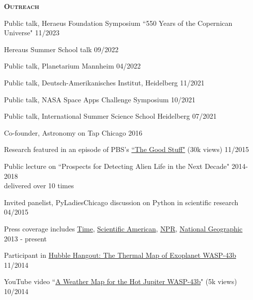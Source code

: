 \documentclass[12pt,letterpaper]{article}
\begin{document}
\textbf{\textsc{Outreach}} 
\begin{compactitem}[]
\item Public talk, Heraeus Foundation Symposium  ``550 Years of the Copernican Universe"  \hfill 11/2023
\item Hereaus Summer School talk \hfill 09/2022
\item Public talk, Planetarium Mannheim \hfill 04/2022
\item Public talk, Deutsch-Amerikanisches Institut, Heidelberg \hfill 11/2021
\item Public talk, NASA Space Apps Challenge Symposium \hfill 10/2021
\item Public talk, International Summer Science School Heidelberg \hfill 07/2021
\item Co-founder, Astronomy on Tap Chicago \hfill 2016
\item Research featured in an episode of PBS's \href{https://www.youtube.com/watch?v=i4Hrmh6LJ0Q&index=2&list=PLsRLUurFnvvXTEbTjA1tvHhWmh6aKTgDw}{``The Good Stuff"} (30k views) \hfill 11/2015
\item Public lecture on ``Prospects for Detecting Alien Life in the Next Decade" \hfill 2014-2018 \\
\hspace*{5 mm}delivered over 10 times
\item Invited panelist, PyLadiesChicago discussion on Python in scientific research \hfill 04/2015
\item Press coverage includes \href{http://science.time.com/2013/12/31/the-real-space-oddities-super-earths-and-jumbo-neptunes/}{Time}, \href{http://www.nature.com/scientificamerican/journal/v23/n3s/full/scientificamericanuniverse0814-4.html}{Scientific American}, \href{http://www.npr.org/2014/01/02/259222620/on-planet-gj1214-b-expect-exotic-cloud-cover}{NPR}, \href{http://news.nationalgeographic.com/news/2014/10/141014-space-hubble-planet-weather-science/?utm_source=Twitter&utm_medium=Social&utm_content=link_tw20141014news-hubbletele&utm_campaign=Content&sf5218387=1}{National Geographic} \hfill 2013 - present
\item Participant in \href{https://www.youtube.com/watch?v=n-oDqYCf3XY}{Hubble Hangout: The Thermal Map of Exoplanet WASP-43b} \hfill 11/2014
\item YouTube video ``\href{https://www.youtube.com/watch?v=tQZqAVhUk9E}{A Weather Map for the Hot Jupiter WASP-43b}" (5k views) \hfill 10/2014

\end{compactitem}
\end{document}
